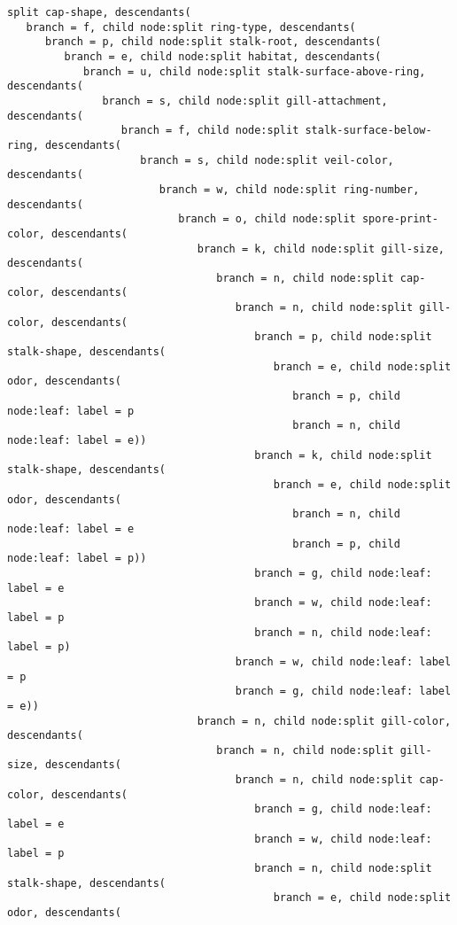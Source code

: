 \documentclass[11pt]{article}
\begin{document}
\begin{Verbatim}[commandchars=\\\{\}]
split cap-shape, descendants(
   branch = f, child node:split ring-type, descendants(
      branch = p, child node:split stalk-root, descendants(
         branch = e, child node:split habitat, descendants(
            branch = u, child node:split stalk-surface-above-ring, descendants(
               branch = s, child node:split gill-attachment, descendants(
                  branch = f, child node:split stalk-surface-below-ring, descendants(
                     branch = s, child node:split veil-color, descendants(
                        branch = w, child node:split ring-number, descendants(
                           branch = o, child node:split spore-print-color, descendants(
                              branch = k, child node:split gill-size, descendants(
                                 branch = n, child node:split cap-color, descendants(
                                    branch = n, child node:split gill-color, descendants(
                                       branch = p, child node:split stalk-shape, descendants(
                                          branch = e, child node:split odor, descendants(
                                             branch = p, child node:leaf: label = p
                                             branch = n, child node:leaf: label = e))
                                       branch = k, child node:split stalk-shape, descendants(
                                          branch = e, child node:split odor, descendants(
                                             branch = n, child node:leaf: label = e
                                             branch = p, child node:leaf: label = p))
                                       branch = g, child node:leaf: label = e
                                       branch = w, child node:leaf: label = p
                                       branch = n, child node:leaf: label = p)
                                    branch = w, child node:leaf: label = p
                                    branch = g, child node:leaf: label = e))
                              branch = n, child node:split gill-color, descendants(
                                 branch = n, child node:split gill-size, descendants(
                                    branch = n, child node:split cap-color, descendants(
                                       branch = g, child node:leaf: label = e
                                       branch = w, child node:leaf: label = p
                                       branch = n, child node:split stalk-shape, descendants(
                                          branch = e, child node:split odor, descendants(

\end{Verbatim}
\end{document}
